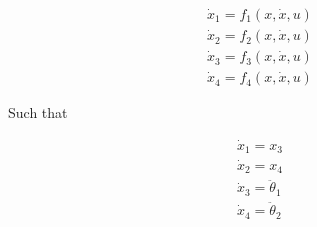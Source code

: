 \documentclass[journal]{IEEEtran}
\begin{document}
\begin{equation}
\begin{array}{l}
\dot{x}_{1}=f_{1}(x, \dot{x}, u) \\
\dot{x}_{2}=f_{2}(x, \dot{x}, u) \\
\dot{x}_{3}=f_{3}(x, \dot{x}, u) \\
\dot{x}_{4}=f_{4}(x, \dot{x}, u)
\end{array}
\end{equation}


Such that


\begin{equation}
\begin{array}{l}
\dot{x}_{1}=x_{3} \\
\dot{x}_{2}=x_{4} \\
\dot{x}_{3}=\ddot{\theta}_{1} \\
\dot{x}_{4}=\ddot{\theta}_{2}
\end{array}
\end{equation}
\end{document}
